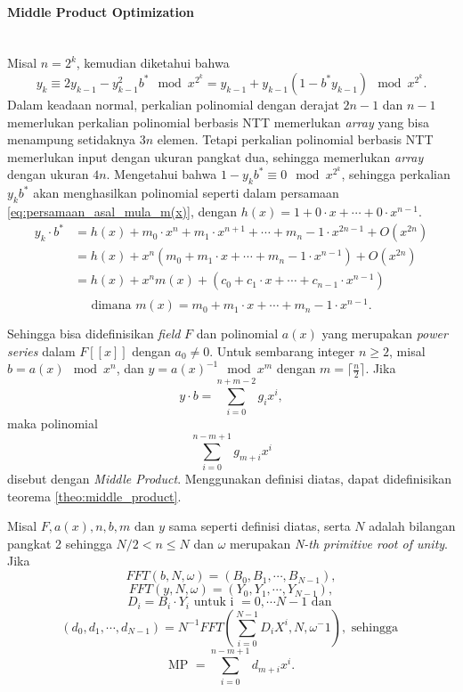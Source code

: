 \paragraph{Middle Product Optimization} \mbox{}\\
\indent Misal $ n = 2^k $, kemudian diketahui bahwa
$$ y_k \equiv 2y_{k-1} - y_{k-1}^2 b^* \mod{x^{2^{k}}} = y_{k-1} + y_{k-1}(1 - b^* y_{k-1}) \mod{x^{2^k}}. $$
Dalam keadaan normal, perkalian polinomial dengan derajat $ 2n - 1 $ dan $ n - 1 $ memerlukan perkalian polinomial berbasis NTT memerlukan \textit{array} yang bisa menampung setidaknya $ 3n $ elemen. Tetapi perkalian polinomial berbasis NTT memerlukan input dengan ukuran pangkat dua, sehingga memerlukan \textit{array} dengan ukuran $ 4n $. Mengetahui bahwa $ 1-y_kb^* \equiv 0 \mod{x^{2^k}} $, sehingga perkalian $ y_kb^* $ akan menghasilkan polinomial seperti dalam persamaan \eqref{eq:persamaan_asal_mula_m(x)}, dengan $ h(x) = 1 + 0 \cdot x + \cdots + 0 \cdot x^{n-1}. $
\begin{equation}
	\begin{aligned}
y_k \cdot b^* &= h(x) + m_0 \cdot x^n + m_1 \cdot x^{n+1} + \cdots + m_n-1 \cdot x^{2n-1} + O(x^{2n}) \\
			  &= h(x) + x^n ( m_0 + m_1 \cdot x + \cdots + m_n-1 \cdot x^{n-1}) + O(x^{2n}) \\
			  &= h(x) + x^n m(x) + (c_0 + c_1 \cdot x + \cdots + c_{n-1} \cdot x^{n-1} ) \\
	\end{aligned}
	\label{eq:persamaan_asal_mula_m(x)}
\end{equation}
$$ \text{dimana } m(x) = m_0 + m_1 \cdot x + \cdots + m_n-1 \cdot x^{n-1}. $$

Sehingga bisa didefinisikan \textit{field} $ F $ dan polinomial $ a(x) $ yang merupakan \textit{power series} dalam $ F[[x]] $ dengan $ a_0 \neq 0 $. Untuk sembarang integer $ n \geq 2 $, misal $ b = a(x) \mod{x^n} $, dan $ y = a(x)^{-1} \mod{x^m} $ dengan $ m = \lceil \frac{n}{2} \rceil $. Jika 
$$ y \cdot b = \sum_{i=0}^{n+m-2}g_ix^i, $$ maka polinomial $$ \sum_{i=0}^{n-m+1} g_{m+i} x^i $$ disebut dengan \textit{Middle Product}.
Menggunakan definisi diatas, dapat didefinisikan teorema \ref{theo:middle_product}\cite{middle_product_op}.

\begin{theo}
	\label{theo:middle_product}
	Misal $ F,a(x),n,b,m \text{ dan } y $ sama seperti definisi diatas, serta $ N $ adalah bilangan pangkat 2 sehingga $ N/2 < n \leq N $ dan $ \omega $ merupakan \textit{N-th primitive root of unity}. Jika
		$$ FFT(b,N,\omega) = (B_0, B_1, \cdots, B_{N-1}), $$
		$$ FFT(y,N,\omega) = (Y_0, Y_1, \cdots, Y_{N-1}), $$
		$$ D_i = B_i \cdot Y_i \text{ untuk i } = 0, \cdots N-1 \text{ dan } $$
		$$ (d_0, d_1, \cdots , d_{N-1}) = N^{-1} FFT(\sum_{i=0}^{N-1} D_iX^i, N, \omega^-1), \text{ sehingga } $$
		$$ \text{MP } = \sum_{i=0}^{n-m+1} d_{m+i}x^i. $$
		\label{eq:middle_product}
\end{theo}

